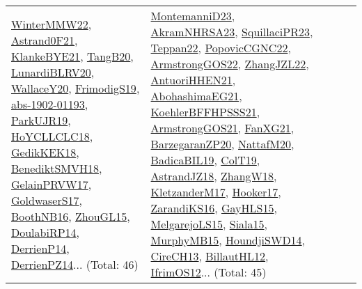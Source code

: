 {\begin{longtable}{lp{3cm}>{\raggedright}p{6cm}>{\raggedright}p{6cm}p{8cm}}
\href{papers/WinterMMW22.pdf}{WinterMMW22}\cite{WinterMMW22}, \href{papers/Astrand0F21.pdf}{Astrand0F21}\cite{Astrand0F21}, \href{papers/KlankeBYE21.pdf}{KlankeBYE21}\cite{KlankeBYE21}, \href{papers/TangB20.pdf}{TangB20}\cite{TangB20}, \href{articles/LunardiBLRV20.pdf}{LunardiBLRV20}\cite{LunardiBLRV20}, \href{articles/WallaceY20.pdf}{WallaceY20}\cite{WallaceY20}, \href{papers/FrimodigS19.pdf}{FrimodigS19}\cite{FrimodigS19}, \href{articles/abs-1902-01193.pdf}{abs-1902-01193}\cite{abs-1902-01193}, \href{papers/ParkUJR19.pdf}{ParkUJR19}\cite{ParkUJR19}, \href{papers/HoYCLLCLC18.pdf}{HoYCLLCLC18}\cite{HoYCLLCLC18}, \href{articles/GedikKEK18.pdf}{GedikKEK18}\cite{GedikKEK18}, \href{papers/BenediktSMVH18.pdf}{BenediktSMVH18}\cite{BenediktSMVH18}, \href{papers/GelainPRVW17.pdf}{GelainPRVW17}\cite{GelainPRVW17}, \href{papers/GoldwaserS17.pdf}{GoldwaserS17}\cite{GoldwaserS17}, \href{papers/BoothNB16.pdf}{BoothNB16}\cite{BoothNB16}, \href{papers/ZhouGL15.pdf}{ZhouGL15}\cite{ZhouGL15}, \href{papers/DoulabiRP14.pdf}{DoulabiRP14}\cite{DoulabiRP14}, \href{papers/DerrienP14.pdf}{DerrienP14}\cite{DerrienP14}, \href{papers/DerrienPZ14.pdf}{DerrienPZ14}\cite{DerrienPZ14}... (Total: 46) & \href{articles/MontemanniD23.pdf}{MontemanniD23}\cite{MontemanniD23}, \href{articles/AkramNHRSA23.pdf}{AkramNHRSA23}\cite{AkramNHRSA23}, \href{papers/SquillaciPR23.pdf}{SquillaciPR23}\cite{SquillaciPR23}, \href{papers/Teppan22.pdf}{Teppan22}\cite{Teppan22}, \href{papers/PopovicCGNC22.pdf}{PopovicCGNC22}\cite{PopovicCGNC22}, \href{papers/ArmstrongGOS22.pdf}{ArmstrongGOS22}\cite{ArmstrongGOS22}, \href{papers/ZhangJZL22.pdf}{ZhangJZL22}\cite{ZhangJZL22}, \href{papers/AntuoriHHEN21.pdf}{AntuoriHHEN21}\cite{AntuoriHHEN21}, \href{articles/AbohashimaEG21.pdf}{AbohashimaEG21}\cite{AbohashimaEG21}, \href{articles/KoehlerBFFHPSSS21.pdf}{KoehlerBFFHPSSS21}\cite{KoehlerBFFHPSSS21}, \href{papers/ArmstrongGOS21.pdf}{ArmstrongGOS21}\cite{ArmstrongGOS21}, \href{articles/FanXG21.pdf}{FanXG21}\cite{FanXG21}, \href{papers/BarzegaranZP20.pdf}{BarzegaranZP20}\cite{BarzegaranZP20}, \href{papers/NattafM20.pdf}{NattafM20}\cite{NattafM20}, \href{papers/BadicaBIL19.pdf}{BadicaBIL19}\cite{BadicaBIL19}, \href{papers/ColT19.pdf}{ColT19}\cite{ColT19}, \href{papers/AstrandJZ18.pdf}{AstrandJZ18}\cite{AstrandJZ18}, \href{articles/ZhangW18.pdf}{ZhangW18}\cite{ZhangW18}, \href{papers/KletzanderM17.pdf}{KletzanderM17}\cite{KletzanderM17}, \href{papers/Hooker17.pdf}{Hooker17}\cite{Hooker17}, \href{articles/ZarandiKS16.pdf}{ZarandiKS16}\cite{ZarandiKS16}, \href{papers/GayHLS15.pdf}{GayHLS15}\cite{GayHLS15}, \href{papers/MelgarejoLS15.pdf}{MelgarejoLS15}\cite{MelgarejoLS15}, \href{articles/Siala15.pdf}{Siala15}\cite{Siala15}, \href{papers/MurphyMB15.pdf}{MurphyMB15}\cite{MurphyMB15}, \href{papers/HoundjiSWD14.pdf}{HoundjiSWD14}\cite{HoundjiSWD14}, \href{papers/CireCH13.pdf}{CireCH13}\cite{CireCH13}, \href{papers/BillautHL12.pdf}{BillautHL12}\cite{BillautHL12}, \href{papers/IfrimOS12.pdf}{IfrimOS12}\cite{IfrimOS12}... (Total: 45)\\

\end{longtable}}
